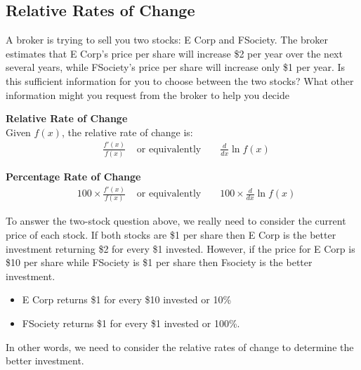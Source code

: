 \documentclass[14pt]{extarticle}
\begin{document}
\subsection{Relative Rates of Change}
A broker is trying to sell you two stocks: E Corp and FSociety. The broker estimates that E Corp’s price per share will increase \$2 per year over the next several years, while FSociety’s price per share will increase only \$1 per year. Is this sufficient information for you to choose between the two stocks? What other information might you request from the broker to help you decide

\begin{tcolorbox}[enhanced jigsaw,colback=bg,boxrule=0pt,arc=0pt]
	\textbf{Relative Rate of Change} \\
	Given $f(x)$, the relative rate of change is:
	\begin{align*}
		&\frac{f'(x)}{f(x)} &
		\text{ or equivalently }	&
		&\frac{d}{dx}\ln f(x)
	\end{align*}
\end{tcolorbox}

\begin{tcolorbox}[enhanced jigsaw,colback=bg,boxrule=0pt,arc=0pt]
	\textbf{Percentage Rate of Change} \\
	\begin{align*}
		&100 \times \frac{f'(x)}{f(x)} &
		\text{ or equivalently }	&
		&100 \times \frac{d}{dx}\ln f(x)
	\end{align*}
\end{tcolorbox}

To answer the two-stock question above, we really need to consider the current price of each stock. If both stocks are \$1 per share then E Corp is the better investment returning \$2 for every \$1 invested.
However, if the price for E Corp is \$10 per share while FSociety is \$1 per share then Fsociety is the better investment.
\begin{itemize}
	\item E Corp returns \$1 for every \$10 invested or 10\%
	\item FSociety returns \$1 for every \$1 invested or 100\%.
\end{itemize}

In other words, we need to consider the relative rates of change to determine the better investment.
\end{document}
